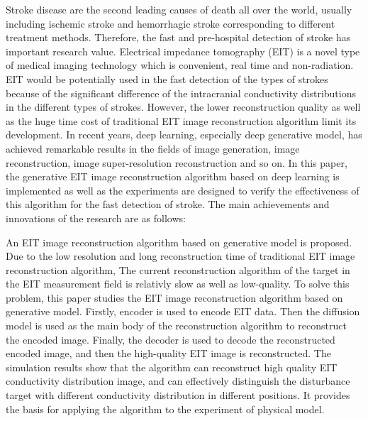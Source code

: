 
\begin{englishabstract}

    Stroke disease are the second leading causes of death all over the world, 
    usually including ischemic stroke and hemorrhagic stroke corresponding to different treatment methods.
    Therefore, the fast and pre-hospital detection of stroke has important research value. 
    Electrical impedance tomography (EIT) is a novel type of medical imaging technology which is convenient, real time and non-radiation. 
    EIT would be potentially used in the fast detection of the types of strokes because of the significant difference of the intracranial conductivity distributions in the different types of strokes. 
    However, the lower reconstruction quality as well as the huge time cost of traditional EIT image reconstruction algorithm limit its development. 
    In recent years, deep learning, especially deep generative model, has achieved remarkable results in the fields of image generation, image reconstruction, image super-resolution reconstruction and so on. 
    In this paper, the generative EIT image reconstruction algorithm based on deep learning is implemented as well as the experiments are designed to verify the effectiveness of this algorithm for the fast detection of stroke. 
    The main achievements and innovations of the research are as follows:

    An EIT image reconstruction algorithm based on generative model is proposed. 
    Due to the low resolution and long reconstruction time of traditional EIT image reconstruction algorithm,
    The current reconstruction algorithm of the target in the EIT measurement field is relativly slow as well as low-quality.
    To solve this problem, this paper studies the EIT image reconstruction algorithm based on generative model.
    Firstly, encoder is used to encode EIT data. 
    Then the diffusion model is used as the main body of the reconstruction algorithm to reconstruct the encoded image.
    Finally, the decoder is used to decode the reconstructed encoded image, and then the high-quality EIT image is reconstructed.
The simulation results show that the algorithm can reconstruct high quality EIT conductivity distribution image, and can effectively distinguish the disturbance target with different conductivity distribution in different positions.
It provides the basis for applying the algorithm to the experiment of physical model.


\end{englishabstract}
